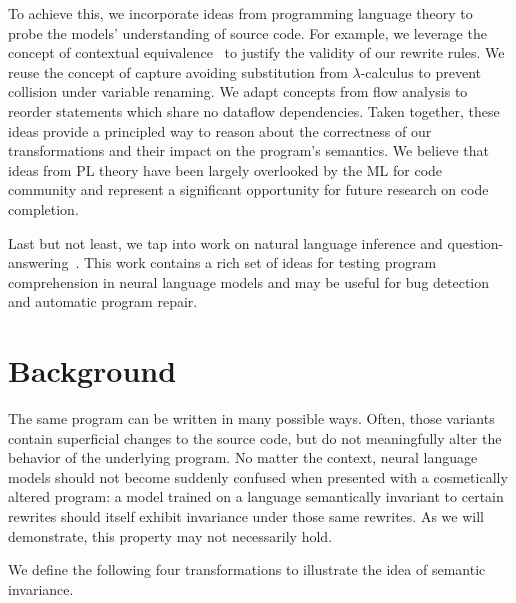 \documentclass[usenames,dvipsnames]{article} %
\begin{document}
  To achieve this, we incorporate ideas from programming language theory to probe the models' understanding of source code. For example, we leverage the concept of contextual equivalence~\citep{morris1969lambda} to justify the validity of our rewrite rules. We reuse the concept of capture avoiding substitution from $\lambda$-calculus to prevent collision under variable renaming. We adapt concepts from flow analysis to reorder statements which share no dataflow dependencies. Taken together, these ideas provide a principled way to reason about the correctness of our transformations and their impact on the program's semantics. We believe that ideas from PL theory have been largely overlooked by the ML for code community and represent a significant opportunity for future research on code completion.

  Last but not least, we tap into work on natural language inference and question-answering~\citep{liu2021codeqa}. This work contains a rich set of ideas for testing program comprehension in neural language models and may be useful for bug detection and automatic program repair.

  \pagebreak\section{Background}\label{sec:background}

  The same program can be written in many possible ways. Often, those variants contain superficial changes to the source code, but do not meaningfully alter the behavior of the underlying program. No matter the context, neural language models should not become suddenly confused when presented with a cosmetically altered program: a model trained on a language semantically invariant to certain rewrites should itself exhibit invariance under those same rewrites. As we will demonstrate, this property may not necessarily hold.

  We define the following four transformations to illustrate the idea of semantic invariance.
\end{document}
